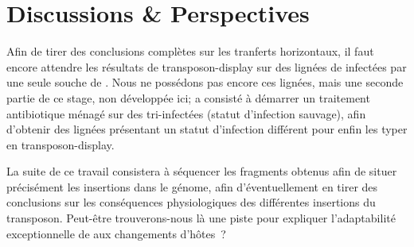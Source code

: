 
\section{Discussions \& Perspectives} %
\label{sec:discussions}








Afin de tirer des conclusions complètes sur les tranferts horizontaux, il faut encore attendre les résultats de transposon-display sur des lignées de  infectées par une seule souche de .
Nous ne possédons pas encore ces lignées, mais une seconde partie de ce stage, non développée ici; a consisté à démarrer un traitement antibiotique ménagé sur des  tri-infectées (statut d'infection sauvage), afin d'obtenir des lignées présentant un statut d'infection différent pour enfin les typer en transposon-display.

La suite de ce travail consistera à séquencer les fragments obtenus afin de situer précisément les insertions dans le génome, afin d’éventuellement en tirer des conclusions sur les conséquences physiologiques des différentes insertions du transposon. Peut-être trouverons-nous là une piste pour expliquer l’adaptabilité exceptionnelle de  aux changements d’hôtes ?
